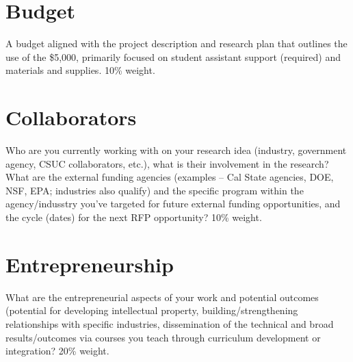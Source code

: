 \documentclass[letterpaper]{article}
\begin{document}
\section{Budget}
A budget aligned with the project description and research plan that outlines the use of the \$5,000, primarily focused on student assistant support (required) and materials and supplies. 10\% weight.

\section{Collaborators}
Who are you currently working with on your research idea (industry, government agency, CSUC collaborators, etc.), what is their involvement in the research? What are the external funding agencies (examples – Cal State agencies, DOE, NSF, EPA; industries also qualify) and the specific program within the agency/indusstry you’ve targeted for future external funding opportunities, and the cycle (dates) for the next RFP opportunity? 10\% weight.

\section{Entrepreneurship}
What are the entrepreneurial aspects of your work and potential outcomes (potential for developing intellectual property, building/strengthening relationships with specific industries, dissemination of the technical and broad results/outcomes via courses you teach through curriculum development or integration? 20\% weight.
\end{document}
